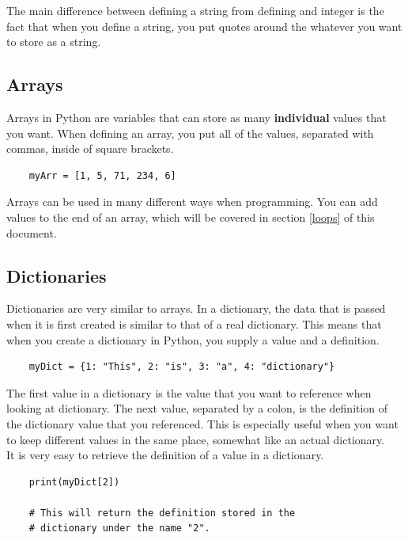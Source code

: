 \documentclass[12pt, letterpaper]{article}
\begin{document}
    The main difference between defining a string from defining and integer is the fact that when you define a string, you put quotes around the whatever you want to store as a string.

    \subsection{Arrays} \label{arrays}

    Arrays in Python are variables that can store as many \textbf{individual} values that you want. When defining an array, you put all of the values, separated with commas, inside of square brackets.

    \begin{verbatim}
    myArr = [1, 5, 71, 234, 6]
    \end{verbatim}

    Arrays can be used in many different ways when programming. You can add values to the end of an array, which will be covered in section \ref{loops} of this document.
    
    \subsection{Dictionaries} \label{dictionaries}

    Dictionaries are very similar to arrays. In a dictionary, the data that is passed when it is first created is similar to that of a real dictionary. This means that when you create a dictionary in Python, you supply a value and a definition.

    \begin{verbatim}
    myDict = {1: "This", 2: "is", 3: "a", 4: "dictionary"}
    \end{verbatim}

    The first value in a dictionary is the value that you want to reference when looking at dictionary. The next value, separated by a colon, is the definition of the dictionary value that you referenced. This is especially useful when you want to keep different values in the same place, somewhat like an actual dictionary. \\

    It is very easy to retrieve the definition of a value in a dictionary. 

    \begin{verbatim}
    print(myDict[2])
    
    # This will return the definition stored in the 
    # dictionary under the name "2".
    \end{verbatim}
\end{document}
